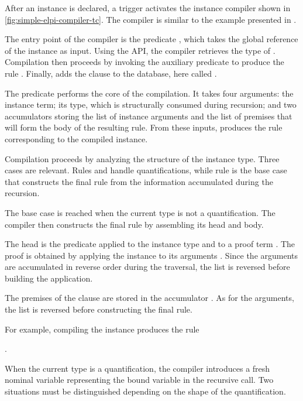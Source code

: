 After an instance is declared, a trigger activates the instance compiler
shown in \cref{fig:simple-elpi-compiler-tc}. The compiler is similar to the
example presented in \cite[Sec.~4.5]{hdr}.

The entry point of the compiler is the predicate , which takes the
global reference  of the instance as input. Using the
 API, the compiler retrieves the type  of .
Compilation then proceeds by invoking the auxiliary predicate  to
produce the rule . Finally,  adds the clause
 to the database, here called .

The predicate  performs the core of the compilation. It takes four
arguments: the instance term; its type, which is structurally consumed during
recursion; and two accumulators storing the list of instance arguments and the
list of premises that will form the body of the resulting rule. From these
inputs,  produces the \elpi rule corresponding to the compiled
instance.

Compilation proceeds by analyzing the structure of the instance type. Three
cases are relevant. Rules  and
 handle quantifications, while rule
 is the base case that constructs the final \elpi rule from
the information accumulated during the recursion.

The base case is reached when the current type  is not a quantification.
The compiler then constructs the final rule by assembling its head and body.

The head is the predicate  applied to the instance type  and to a
proof term . The proof is obtained by applying the instance  to
its arguments . Since the arguments are accumulated in reverse order
during the traversal, the list  is reversed before building the
application.

The premises of the clause are stored in the accumulator . As for the
arguments, the list is reversed before constructing the final rule.

For example, compiling the instance  produces the rule

\begin{center}
  .
\end{center}

When the current type  is a quantification, the compiler introduces a
fresh nominal variable representing the bound variable in the recursive call.
Two situations must be distinguished depending on the shape of the
quantification.

